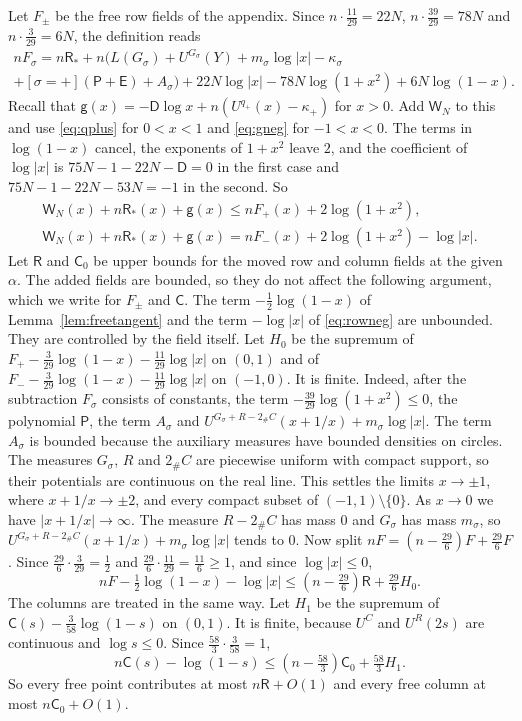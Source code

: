 Let $F_\pm$ be the free row fields of the appendix. Since $n\cdot\frac{11}{29}=22N$, $n\cdot\frac{39}{29}=78N$ and $n\cdot\frac3{29}=6N$, the definition reads
\begin{multline*}
 nF_\sigma=n\mathsf R_*+n\bigl(L(G_\sigma)+U^{G_\sigma}(Y)+m_\sigma\log|x|-\kappa_\sigma\\
 +[\sigma=+](\mathsf P+\mathsf E)+A_\sigma\bigr)+22N\log|x|-78N\log(1+x^2)+6N\log(1-x).
\end{multline*}
Recall that $\mathsf g(x)=-\mathsf D\log x+n(U^{q_+}(x)-\kappa_+)$ for $x>0$. Add $\mathsf W_N$ to this and use \eqref{eq:qplus} for $0<x<1$ and \eqref{eq:gneg} for $-1<x<0$. The terms in $\log(1-x)$
cancel, the exponents of $1+x^2$ leave $2$, and the coefficient of $\log|x|$ is $75N-1-22N-\mathsf D=0$ in the first case and $75N-1-22N-53N=-1$ in the second. So
\begin{gather}
 \mathsf W_N(x)+n\mathsf R_*(x)+\mathsf g(x)\le nF_+(x)+2\log(1+x^2),\label{eq:rowpos}\\
 \mathsf W_N(x)+n\mathsf R_*(x)+\mathsf g(x)=nF_-(x)+2\log(1+x^2)-\log|x|.\label{eq:rowneg}
\end{gather}
Let $\mathsf R$ and $\mathsf C_0$ be upper bounds for the moved row and column fields at the given $\alpha$. The added fields are bounded, so they do not affect the following argument, which we write for $F_\pm$ and $\mathsf C$.
The term $-\frac12\log(1-x)$ of Lemma~\ref{lem:freetangent} and the term $-\log|x|$ of \eqref{eq:rowneg} are unbounded. They are controlled by the field itself. Let $H_0$ be the supremum of $F_+-\frac3{29}\log(1-x)-\frac{11}{29}\log|x|$ on $(0,1)$ and of $F_--\frac3{29}\log(1-x)-\frac{11}{29}\log|x|$ on $(-1,0)$. It is finite.
Indeed, after the subtraction $F_\sigma$ consists of constants, the term $-\frac{39}{29}\log(1+x^2)\le0$, the polynomial $\mathsf P$, the term $A_\sigma$ and
$U^{G_\sigma+R-2_\#C}(x+1/x)+m_\sigma\log|x|$. The term $A_\sigma$ is bounded because the auxiliary measures have bounded densities on circles. The measures $G_\sigma$, $R$ and $2_\#C$
are piecewise uniform with compact support, so their potentials are continuous on the real line. This settles the limits $x\to\pm1$, where $x+1/x\to\pm2$, and every compact subset of
$(-1,1)\setminus\{0\}$. As $x\to0$ we have $|x+1/x|\to\infty$. The measure $R-2_\#C$ has mass $0$ and $G_\sigma$ has mass $m_\sigma$, so $U^{G_\sigma+R-2_\#C}(x+1/x)+m_\sigma\log|x|$ tends to $0$.
Now split $nF=(n-\frac{29}6)F+\frac{29}6F$. Since $\frac{29}6\cdot\frac3{29}=\frac12$ and $\frac{29}6\cdot\frac{11}{29}=\frac{11}6\ge1$, and since $\log|x|\le0$,
\[
 nF-\tfrac12\log(1-x)-\log|x|\le(n-\tfrac{29}6)\mathsf R+\tfrac{29}6H_0 .
\]
The columns are treated in the same way. Let $H_1$ be the supremum of $\mathsf C(s)-\frac3{58}\log(1-s)$ on $(0,1)$. It is finite, because $U^C$ and $U^R(2s)$ are continuous and
$\log s\le0$. Since $\frac{58}3\cdot\frac3{58}=1$,
\[
 n\mathsf C(s)-\log(1-s)\le(n-\tfrac{58}3)\mathsf C_0+\tfrac{58}3H_1 .
\]
So every free point contributes at most $n\mathsf R+O(1)$ and every free column at most $n\mathsf C_0+O(1)$. 

